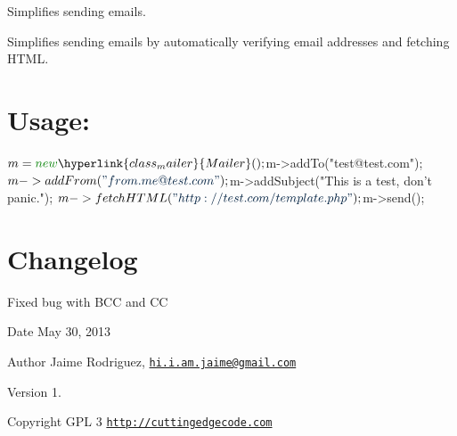 Simplifies sending emails.

Simplifies sending emails by automatically verifying email addresses and fetching H\-T\-M\-L.\hypertarget{robo1_usage}{}\section{Usage\-:}\label{robo1_usage}

\begin{DoxyCode}
$m = \textcolor{keyword}{new} \hyperlink{class_mailer}{Mailer}();
$m->addTo(\textcolor{stringliteral}{"test@test.com"});
$m->addFrom(\textcolor{stringliteral}{"from.me@test.com"});
$m->addSubject(\textcolor{stringliteral}{"This is a test, don't panic."});
$m->fetchHTML(\textcolor{stringliteral}{"http://test.com/template.php"});
$m->send();
\end{DoxyCode}
\hypertarget{mailer1_changelog}{}\section{Changelog}\label{mailer1_changelog}

\begin{DoxyItemize}
\item Fixed bug with B\-C\-C and C\-C
\end{DoxyItemize}

\begin{DoxyDate}{Date}
May 30, 2013 
\end{DoxyDate}
\begin{DoxyAuthor}{Author}
Jaime Rodriguez, \href{mailto:hi.i.am.jaime@gmail.com}{\tt hi.\-i.\-am.\-jaime@gmail.\-com} 
\end{DoxyAuthor}
\begin{DoxyVersion}{Version}
1. 
\end{DoxyVersion}
\begin{DoxyCopyright}{Copyright}
G\-P\-L 3 \href{http://cuttingedgecode.com}{\tt http\-://cuttingedgecode.\-com} 
\end{DoxyCopyright}
